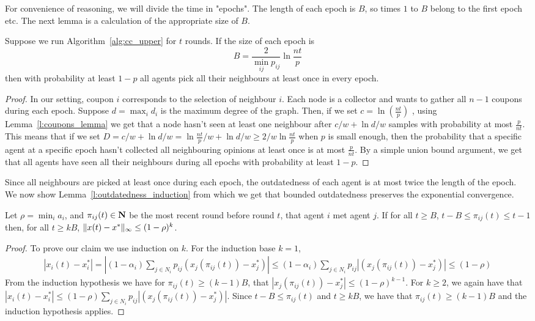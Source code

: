 For convenience of reasoning, we will divide the time in "epochs".
The length of each epoch is $B$, so times $1$ to $B$ belong to the first
epoch etc.
The next lemma is a calculation of the appropriate size of $B$.
\begin{lemma}
Suppose we run Algorithm~\ref{alg:cc_upper} for $t$ rounds. If the size of
each epoch is
\[
B = \frac{2}{\min_{ij}p_{ij}}\ln \frac{nt}{p}
\]
then with probability at least $1-p$ all agents pick all their neighbours
at least once in every epoch.
\end{lemma}
\begin{proof}
In our setting, coupon $i$ corresponds to the selection of neighbour $i$. Each node is a
collector and wants to gather all $n-1$ coupons during each epoch.
Suppose $d = \max_i d_i$ is the maximum degree of the graph.
Then, if we set  $c = \ln (\frac{nt}{p})$ , using Lemma~\ref{l:coupons_lemma}
we get that a node hasn't seen at least one neighbour after $c/w + \ln d/w$ samples
with probability at most $\frac{p}{nt}$. This means that if we set
$D = c/w + \ln d/w =  \ln \frac{nt}{p}/w +  \ln d/w \geq 2/w\ln\frac{nt}{p} $ when $p$ is
small enough, then the probability that a specific agent at a specific epoch hasn't collected
all neighbouring opinions at least once is at most $\frac{p}{nt}$. By a simple union bound argument,
we get that all agents have seen all their neighbours during all epochs
 with probability at least $1 - p$.
\end{proof}
Since all neighbours are picked at least once during each epoch,
the outdatedness of each agent is at most twice the length of the
epoch. We now show Lemma~\ref{l:outdatedness_induction}
from which we get that bounded outdatedness preserves the exponential
convergence.
\begin{lemma}
  Let $\rho = \min_i a_i$, and $\pi_{ij}(t) \in \bm{\mathrm{N}}$ be the most recent round
  before round $t$, that agent $i$ met agent $j$.
  If for all $t\geq B$, $t-B \leq \pi_{ij}(t) \leq t-1$ then, for
  all $t \geq k B$,
  \(\| x(t) - x^* \|_{\infty} \leq (1-\rho)^k\).
\end{lemma}
\begin{proof}
  To prove our claim we use induction on $k$. For the induction base $k=1$,
  \begin{align*}
    |x_i(t) - x_i^*|
    =
    |(1-\alpha_i)\sum_{j \in N_i}p_{ij}(x_j(\pi_{ij}(t)) -x_j^*)|
    \leq
    (1-\alpha_i)\sum_{j \in N_i}p_{ij}|(x_j(\pi_{ij}(t))-x_j^*)|\leq (1-\rho)
  \end{align*}
  From the induction hypothesis we have for $\pi_{ij}(t) \geq (k-1)B$,
  that $|x_j(\pi_{ij}(t))-x_j^*| \leq (1-\rho)^{k-1}$.
  For $k\geq 2$, we again have that
  $|x_i(t) - x_i^*|\leq (1-\rho)\sum_{j \in N_i}p_{ij}|(x_j(\pi_{ij}(t))-x_j^*)|$.
  Since $t-B \leq \pi_{ij}(t)$ and $t\geq kB$, we have
  that $\pi_{ij}(t) \geq (k-1)B$ and the induction hypothesis applies.
\end{proof}

